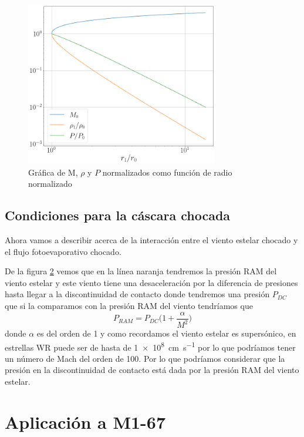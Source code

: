 \documentclass{book}
\begin{document}
\begin{figure}[h]
    \centering    \includegraphics[width=0.75\textwidth]{images Chapter 2/C2_results.png}
    \caption{Gráfica de M, $\rho$ y $P$ normalizados como función de radio normalizado}
    \label{fig:grafica_C2}
\end{figure}

\section{Condiciones para la cáscara chocada}

Ahora vamos a describir acerca de la interacción entre el viento estelar chocado y el flujo fotoevaporativo chocado. 

De la figura \ref{} vemos que en la línea naranja tendremos la presión RAM del viento estelar y este viento tiene una desaceleración por la diferencia de presiones hasta llegar a la discontinuidad de contacto donde tendremos una presión $P_{DC}$ que si la comparamos con la presión RAM del viento tendríamos que
\[P_{RAM}=P_{DC}\Big(1+\frac{\alpha}{M^2}\Big)\] donde $\alpha$ es del orden de 1 y como recordamos el viento estelar es supersónico, en estrellas WR puede ser de hasta de \SI{1e8}{cm.s^{-1}} por lo que podríamos tener un número de Mach del orden de 100. Por lo que podríamos considerar que la presión en la discontinuidad de contacto está dada por la presión RAM del viento estelar.


\chapter{Aplicación a M1-67}
\end{document}
